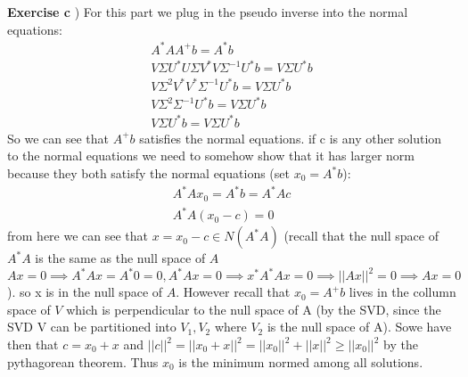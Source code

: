 \documentclass[12pt]{article}
\newenvironment{exercise}[1]{\vspace{.1in}\noindent\textbf{Exercise #1 \hspace{.05em}}}{}
\theoremstyle{definition}
\theoremstyle{remark}
\begin{document}
\begin{exercise}{6.1}
	c)
	For this part we plug in the pseudo inverse into the normal equations:
	\begin{align}
		A^*AA^+b=A^*b                                        \\
		V\Sigma U^*U \Sigma V^*V\Sigma^{-1}U^*b=V\Sigma U^*b \\
		V\Sigma^2V^*V^*\Sigma^{-1}U^*b=V\Sigma U^*b          \\
		V\Sigma^2\Sigma^{-1}U^*b=V\Sigma U^* b               \\
		V\Sigma U^*b=V\Sigma U^*b
	\end{align}
	So we can see that $A^+b$ satisfies the normal equations. if c is any other solution to the normal equations we need to somehow show that it has larger norm because they both satisfy the normal equations (set $x_0=A^*b$):
	\begin{align}
		A^*Ax_0=A^*b=A^*Ac \\
		A^*A(x_0-c)=0
	\end{align}
	from here we can see that $x=x_0-c\in N(A^*A)$ (recall that the null space of $A^*A$ is the same as the null space of $A$ $Ax=0\implies A^*Ax=A^*0=0, A^*Ax=0\implies x^*A^*Ax=0\implies ||Ax||^2=0\implies Ax=0$). so x is in the null space of $A$. However recall that $x_0=A^+b$ lives in the collumn space of $V$ which is perpendicular to the null space of A (by the SVD, since the SVD V can be partitioned into $V_1,V_2$ where $V_2$ is the null space of A). Sowe have then that $c=x_0+x$ and $||c||^2=||x_0+x||^2=||x_0||^2+||x||^2\geq ||x_0||^2$ by the pythagorean theorem. Thus $x_0$ is the minimum normed among all solutions.
\end{exercise}
\end{document}
